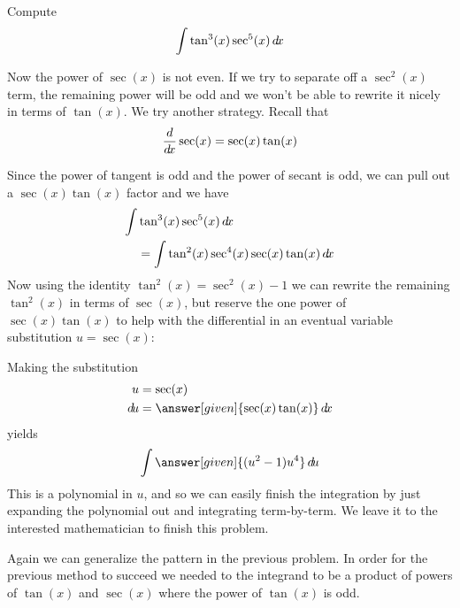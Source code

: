 \documentclass{ximera}
\begin{document}
\begin{example}
  Compute
  \[
  \int \tan^3(x) \sec^5(x) \mathop{}\!d\! x
  \]
  \begin{explanation}
    Now the power of $\sec(x)$ is not even. If we try to separate off a $\sec^{2}(x)$ term, the remaining power 
will be odd and we won't be able to rewrite it nicely in terms of $\tan(x)$.
    We try another strategy. Recall that
\[
\frac{d}{\mathop{}\!d\! x} \sec(x)=\sec(x) \tan(x)
\] 
   
   
    Since the power of tangent is odd and the power of secant is odd,
    we can pull out a $\sec(x)\tan(x)$ factor and we have
    \begin{align*}
    \int &\tan^3(x) \sec^5(x) \mathop{}\!d\! x \\
    &= \int\tan^2(x) \sec^4(x) \sec(x)\tan(x) \mathop{}\!d\! x
    \end{align*}
    Now using the identity $\tan^{2}(x)=\sec^{2}(x)-1$ we can rewrite the remaining $\tan^{2}(x)$ in
    terms of $\sec(x)$, but reserve the one power of $\sec(x)\tan(x)$ to help
    with the differential in an eventual variable substitution $u=\sec(x)$:
    \begin{center}%
    \end{center}
    Making the substitution
    \begin{align*}
      u &= \sec(x)\\
      \d u &=\answer[given]{\sec(x)\tan(x)} \d x
    \end{align*}
    yields
    \[
    \int \answer[given]{(u^2-1)u^4} \d u
    \]
    This is a polynomial in $u$, and so we can easily finish the
    integration by just expanding the polynomial out and integrating
    term-by-term. We leave it to the interested mathematician to
    finish this problem.
  \end{explanation}
\end{example}

Again we can generalize the pattern in the previous problem. In order for the previous method to succeed we needed to the integrand to be a product of powers 
of $\tan(x)$ and $\sec(x)$ where the power of $\tan(x)$ is odd. 
\end{document}
